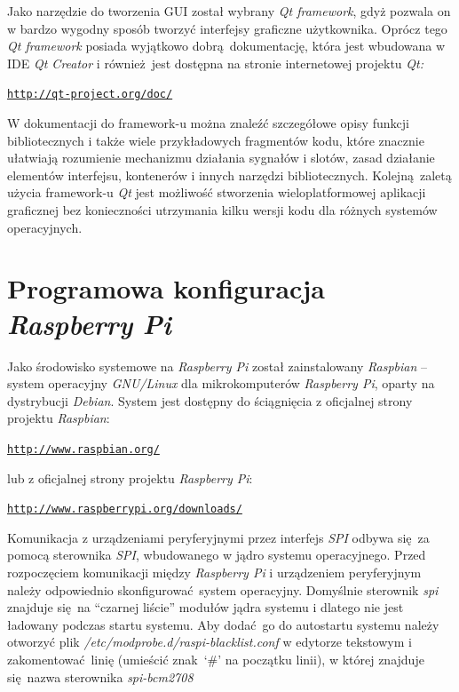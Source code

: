 \documentclass[eng,printmode]{mgr}
\begin{document}
Jako narzędzie do tworzenia GUI został wybrany \emph{Qt framework}, gdyż pozwala on w bardzo wygodny sposób tworzyć interfejsy graficzne użytkownika. Oprócz tego \emph{Qt framework} posiada wyjątkowo dobrą dokumentację, która jest wbudowana w IDE \emph{Qt Creator} i również jest dostępna na stronie internetowej projektu \emph{Qt:} 

\begin{alltt}
    \url{http://qt-project.org/doc/}
\end{alltt}

W dokumentacji do framework-u można znaleźć szczegółowe opisy funkcji bibliotecznych i także wiele przykładowych fragmentów kodu, które znacznie ułatwiają rozumienie mechanizmu działania sygnałów i slotów, zasad działanie elementów interfejsu, kontenerów i innych narzędzi bibliotecznych. Kolejną zaletą użycia framework-u \emph{Qt} jest możliwość stworzenia wieloplatformowej aplikacji graficznej bez konieczności utrzymania kilku wersji kodu dla różnych systemów operacyjnych. 



\section{Programowa konfiguracja \emph{Raspberry Pi}}
Jako środowisko systemowe na \emph{Raspberry Pi} został zainstalowany \emph{Raspbian} -- system operacyjny \emph{GNU/Linux} dla mikrokomputerów \emph{Raspberry Pi}, oparty na dystrybucji \emph{Debian}. System jest dostępny do ściągnięcia z oficjalnej strony projektu \emph{Raspbian}: 

\begin{alltt}
    \url{http://www.raspbian.org/} 
\end{alltt}

lub z oficjalnej strony projektu \emph{Raspberry Pi}:

\begin{alltt}
    \url{http://www.raspberrypi.org/downloads/}
\end{alltt}

Komunikacja z urządzeniami peryferyjnymi przez interfejs \emph{SPI} odbywa się za pomocą sterownika \emph{SPI}, wbudowanego w jądro systemu operacyjnego. Przed rozpoczęciem komunikacji między \emph{Raspberry Pi} i urządzeniem peryferyjnym należy odpowiednio skonfigurować system operacyjny.
Domyślnie sterownik \emph{spi} znajduje się na ``czarnej liście'' modułów jądra systemu i dlatego nie jest ładowany podczas startu systemu.
Aby dodać go do autostartu systemu należy otworzyć plik \emph{/etc/modprobe.d/raspi-blacklist.conf} w edytorze tekstowym i zakomentować linię (umieścić znak `\#' na początku linii), w której znajduje się nazwa sterownika \emph{spi-bcm2708}
\end{document}
